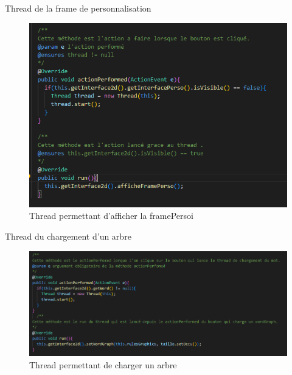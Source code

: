 \documentclass{beamer}
\begin{document}
\begin{frame}

	\begin{block}{Thread de la frame de personnalisation}

	\begin{figure}[h]
	\includegraphics[scale=0.6]{images/interface2DPersoCode.png}
	\caption{Thread permettant d'afficher la framePersoi}
	\end{figure}

	\end{block}

\end{frame}

\begin{frame}
	\begin{block}{Thread du chargement d'un arbre}

	\begin{figure}[h]
	\includegraphics[scale=0.45]{images/loadTreeCode.png}
	\caption{Thread permettant de charger un arbre}
	\end{figure}

	\end{block}

\end{frame}
\end{document}
